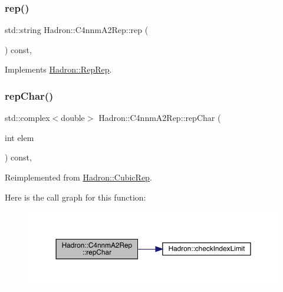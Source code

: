 \subsubsection{\texorpdfstring{rep()}{rep()}\hspace{0.1cm}{\footnotesize\ttfamily [5/5]}}
{\footnotesize\ttfamily std\+::string Hadron\+::\+C4nnm\+A2\+Rep\+::rep (\begin{DoxyParamCaption}{ }\end{DoxyParamCaption}) const\hspace{0.3cm}{\ttfamily [inline]}, {\ttfamily [virtual]}}



Implements \mbox{\hyperlink{structHadron_1_1RepRep_ab3213025f6de249f7095892109575fde}{Hadron\+::\+Rep\+Rep}}.

\mbox{\label{structHadron_1_1C4nnmA2Rep_afb88da7160e06ad4085c5ed34d410bbc}} 
\subsubsection{\texorpdfstring{repChar()}{repChar()}\hspace{0.1cm}{\footnotesize\ttfamily [1/3]}}
{\footnotesize\ttfamily std\+::complex$<$double$>$ Hadron\+::\+C4nnm\+A2\+Rep\+::rep\+Char (\begin{DoxyParamCaption}\item[{int}]{elem }\end{DoxyParamCaption}) const\hspace{0.3cm}{\ttfamily [inline]}, {\ttfamily [virtual]}}



Reimplemented from \mbox{\hyperlink{structHadron_1_1CubicRep_af45227106e8e715e84b0af69cd3b36f8}{Hadron\+::\+Cubic\+Rep}}.

Here is the call graph for this function\+:
\nopagebreak
\begin{figure}[H]
\begin{center}
\leavevmode
\includegraphics[width=350pt]{d6/d9a/structHadron_1_1C4nnmA2Rep_afb88da7160e06ad4085c5ed34d410bbc_cgraph}
\end{center}
\end{figure}
\mbox{\label{structHadron_1_1C4nnmA2Rep_afb88da7160e06ad4085c5ed34d410bbc}} 
